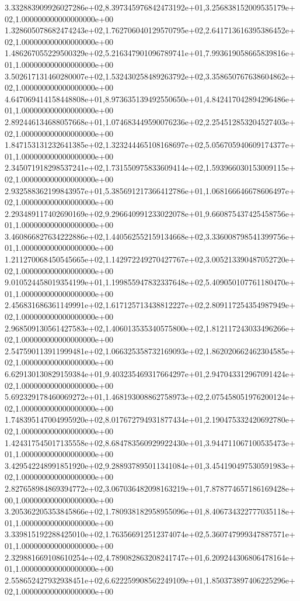 3.332883909926027286e+02,8.397345976842473192e+01,3.256838152009535179e+02,1.000000000000000000e+00
1.328605078682474243e+02,1.762706040129570795e+02,2.641713616395386452e+02,1.000000000000000000e+00
1.486267055229500329e+02,5.216347901096789741e+01,7.993619058665839816e+01,1.000000000000000000e+00
3.502617131460280007e+02,1.532430258489263792e+02,3.358650767638604862e+02,1.000000000000000000e+00
4.647069414158448808e+01,8.973635139492550650e+01,4.842417042894296486e+01,1.000000000000000000e+00
2.892446134688057668e+01,1.074683449590076236e+02,2.254512853204527403e+02,1.000000000000000000e+00
1.847153131232641385e+02,1.323244465108168697e+02,5.056705940609174377e+01,1.000000000000000000e+00
2.345071918298537241e+02,1.731550975833609414e+02,1.593966030153009115e+02,1.000000000000000000e+00
2.932588362199843957e+01,5.385691217366412786e+01,1.068166646678606497e+02,1.000000000000000000e+00
2.293489117402690169e+02,9.296640991233022078e+01,9.660875437425458756e+01,1.000000000000000000e+00
3.460866827634222886e+02,1.440562552159134668e+02,3.336008798541399756e+01,1.000000000000000000e+00
1.211270068450545665e+02,1.142972249270427767e+02,3.005213390487052720e+02,1.000000000000000000e+00
9.010524458019354199e+01,1.199855947832337648e+02,5.409050107761180470e+01,1.000000000000000000e+00
2.456831686361149991e+02,1.617125713438812227e+02,2.809117254354987949e+02,1.000000000000000000e+00
2.968509130561427583e+02,1.406013535340575800e+02,1.812117243033496266e+02,1.000000000000000000e+00
2.547590113911999481e+02,1.066325358732169093e+02,1.862020662462304585e+02,1.000000000000000000e+00
6.629130130829159384e+01,9.403235469317664297e+01,2.947043312967091424e+02,1.000000000000000000e+00
5.692329178460069272e+01,1.468193008862758973e+02,2.075458051976200124e+02,1.000000000000000000e+00
1.748395147004995920e+02,8.017672794931877434e+01,2.190475332420692780e+02,1.000000000000000000e+00
1.424317545017135558e+02,8.684783560929922430e+01,3.944711067100535473e+01,1.000000000000000000e+00
3.429542248991851920e+02,9.288937895011341084e+01,3.454190497530591983e+02,1.000000000000000000e+00
2.827658984869394772e+02,3.067036482098163219e+01,7.878774657186169428e+00,1.000000000000000000e+00
3.205362205353845866e+02,1.780938182958955096e+01,8.406734322777035118e+01,1.000000000000000000e+00
3.339815192288425010e+02,1.763566912512374074e+02,5.360747999347887571e+01,1.000000000000000000e+00
2.329881669108610254e+02,4.789082863208241747e+01,6.209244306806478164e+01,1.000000000000000000e+00
2.558652427932938451e+02,6.622259908562249109e+01,1.850373897406225296e+02,1.000000000000000000e+00

